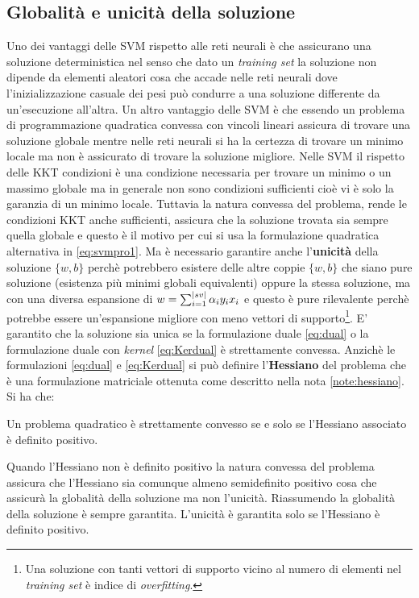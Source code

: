\subsection{Globalità e unicità della soluzione}
\label{sub:globuni}
Uno dei vantaggi delle \ac{SVM} rispetto alle reti neurali è che assicurano una soluzione deterministica nel senso che dato un \textit{training set} la soluzione non dipende da elementi aleatori cosa che accade nelle reti neurali dove l'inizializzazione casuale dei pesi può condurre a una soluzione differente da un'esecuzione all'altra. Un altro vantaggio delle \ac{SVM} è che essendo un problema di programmazione quadratica convessa con vincoli lineari assicura di trovare una soluzione globale mentre nelle reti neurali si ha la certezza di trovare un minimo locale ma non è assicurato di trovare la soluzione migliore. Nelle \ac{SVM} il rispetto delle  KKT condizioni è una condizione necessaria per trovare un minimo o un massimo globale ma in generale non sono condizioni sufficienti cioè vi è solo la garanzia di un minimo locale. Tuttavia la natura convessa del problema, rende le condizioni KKT anche sufficienti, assicura che la soluzione trovata sia sempre quella globale e questo è il motivo per cui si usa la formulazione quadratica alternativa in \ref{eq:svmpro1}. Ma è necessario garantire anche l'\textbf{unicità} della soluzione $\{w,b\}$ perchè potrebbero esistere delle altre coppie $\{w,b\}$ che siano pure soluzione (esistenza più minimi globali equivalenti) oppure la stessa soluzione, ma con una diversa espansione di $w=\sum_{i=1}^{\lvert sv\rvert}\alpha_iy_ix_i$ e questo è pure rilevalente perchè potrebbe essere un'espansione migliore con meno vettori di supporto\footnote{Una soluzione con tanti vettori di supporto vicino al numero di elementi nel \textit{training set} è indice di \textit{overfitting}.}.
E' garantito che la soluzione sia unica se la formulazione duale \ref{eq:dual} o la formulazione duale con \textit{kernel} \ref{eq:Kerdual} è strettamente convessa. Anzichè le formulazioni \ref{eq:dual} e \ref{eq:Kerdual} si può definire l'\textbf{Hessiano} del problema che è una formulazione matriciale ottenuta come descritto nella nota \ref{note:hessiano}. Si ha che:
\begin{teorema*} Un problema quadratico è strettamente convesso se e solo se l'Hessiano associato è definito positivo.
\end{teorema*}
Quando l'Hessiano non è definito positivo la natura convessa del problema assicura che l'Hessiano sia comunque  almeno semidefinito positivo cosa che assicurà la globalità della soluzione ma non l'unicità.  Riassumendo la globalità della soluzione è sempre garantita. L'unicità è garantita solo se l'Hessiano è definito positivo. 

